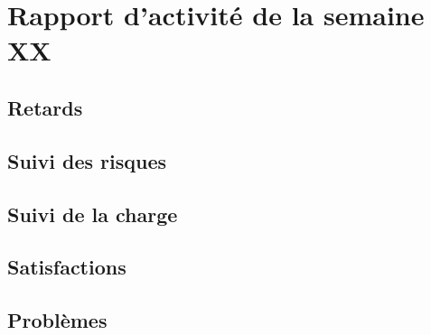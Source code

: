 \section{Rapport d'activité de la semaine XX}

\subsection{Retards}

\subsection{Suivi des risques}

\subsection{Suivi de la charge}

\subsection{Satisfactions}

\subsection{Problèmes}
